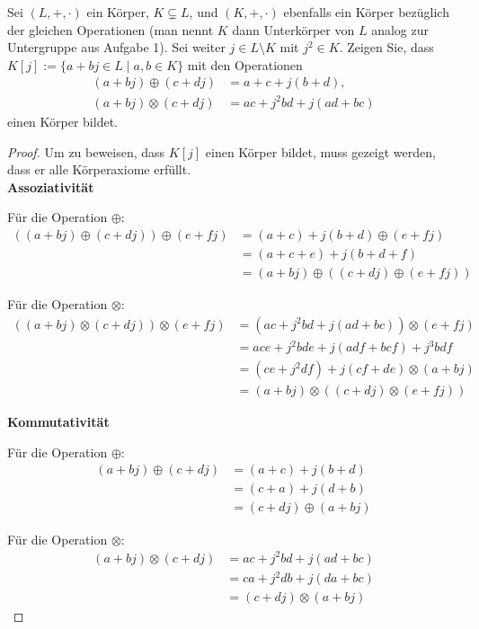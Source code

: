 \documentclass{../problemset}
\begin{document}
\pagebreak

\begin{problem}
Sei $(L, +, \cdot)$ ein Körper, $K \subsetneq L$, und $(K, +, \cdot)$ ebenfalls ein Körper bezüglich der gleichen Operationen (man nennt $K$ dann Unterkörper von $L$ analog zur Untergruppe aus Aufgabe 1). Sei weiter $j \in L \setminus K$ mit $j^2 \in K$. Zeigen Sie, dass $K[j] := \{a + bj \in L \mid a, b \in K\}$ mit den Operationen
\begin{align*}
	(a + bj) \oplus (c + dj)  & = a + c + j(b + d),       \\
	(a + bj) \otimes (c + dj) & = ac + j^2bd + j(ad + bc)
\end{align*}
einen Körper bildet.
\begin{proof}
Um zu beweisen, dass $K[j]$ einen Körper bildet, muss gezeigt werden, dass er alle Körperaxiome erfüllt. \\

\textbf{Assoziativität}

Für die Operation $\oplus$:
\begin{align}
	((a + bj) \oplus (c + dj)) \oplus (e + fj) & = (a + c) + j(b + d) \oplus (e + fj)         \\
	& = (a + c + e) + j(b + d + f)                \\
	& = (a + bj) \oplus ((c + dj) \oplus (e + fj))
\end{align}

Für die Operation $\otimes$:
\begin{align}
	((a + bj) \otimes (c + dj)) \otimes (e + fj) & = (ac + j^2bd + j(ad + bc)) \otimes (e + fj)                   \\
	& = ace + j^2bde + j(adf + bcf) + j^3bdf                    \\
	& = (ce + j^2df) + j(cf + de) \otimes (a + bj)                   \\
	& = (a + bj) \otimes ((c + dj) \otimes (e + fj))
\end{align}

\textbf{Kommutativität}

Für die Operation $\oplus$:
\begin{align}
	(a + bj) \oplus (c + dj) & = (a + c) + j(b + d)         \\
	& = (c + a) + j(d + b)         \\
	& = (c + dj) \oplus (a + bj)
\end{align}

Für die Operation $\otimes$:
\begin{align}
	(a + bj) \otimes (c + dj) & = ac + j^2bd + j(ad + bc)   \\
	& = ca + j^2db + j(da + bc)   \\
	& = (c + dj) \otimes (a + bj)
\end{align}


\end{proof}
\end{problem}
\end{document}
